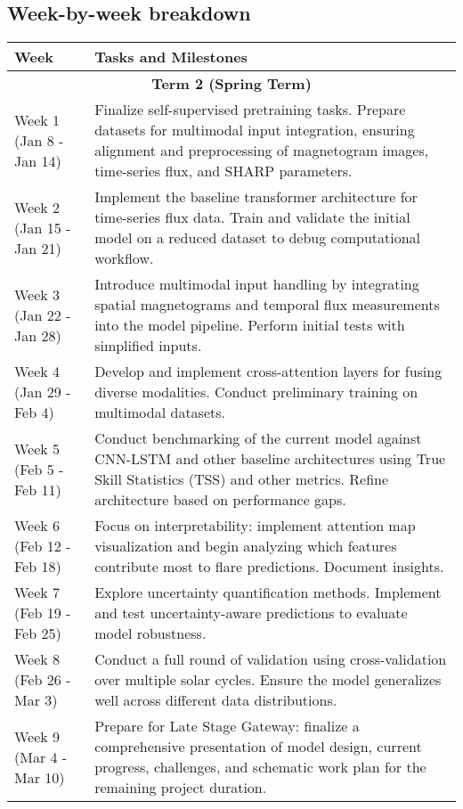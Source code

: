 \subsection{Week-by-week breakdown}
\begin{longtable}{|p{2cm}|p{13cm}|}
\hline
\textbf{Week} & \textbf{Tasks and Milestones} \\
\hline
\multicolumn{2}{|c|}{\textbf{Term 2 (Spring Term)}} \\
\hline
Week 1 (Jan 8 - Jan 14) & Finalize self-supervised pretraining tasks. Prepare datasets for multimodal input integration, ensuring alignment and preprocessing of magnetogram images, time-series flux, and SHARP parameters. \\
\hline
Week 2 (Jan 15 - Jan 21) & Implement the baseline transformer architecture for time-series flux data. Train and validate the initial model on a reduced dataset to debug computational workflow. \\
\hline
Week 3 (Jan 22 - Jan 28) & Introduce multimodal input handling by integrating spatial magnetograms and temporal flux measurements into the model pipeline. Perform initial tests with simplified inputs. \\
\hline
Week 4 (Jan 29 - Feb 4) & Develop and implement cross-attention layers for fusing diverse modalities. Conduct preliminary training on multimodal datasets. \\
\hline
Week 5 (Feb 5 - Feb 11) & Conduct benchmarking of the current model against CNN-LSTM and other baseline architectures using True Skill Statistics (TSS) and other metrics. Refine architecture based on performance gaps. \\
\hline
Week 6 (Feb 12 - Feb 18) & Focus on interpretability: implement attention map visualization and begin analyzing which features contribute most to flare predictions. Document insights. \\
\hline
Week 7 (Feb 19 - Feb 25) & Explore uncertainty quantification methods. Implement and test uncertainty-aware predictions to evaluate model robustness. \\
\hline
Week 8 (Feb 26 - Mar 3) & Conduct a full round of validation using cross-validation over multiple solar cycles. Ensure the model generalizes well across different data distributions. \\
\hline
Week 9 (Mar 4 - Mar 10) & Prepare for Late Stage Gateway: finalize a comprehensive presentation of model design, current progress, challenges, and schematic work plan for the remaining project duration. \\

\end{longtable}
